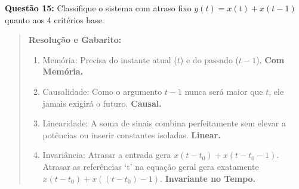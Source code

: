 \textbf{Questão 15:} Classifique o sistema com atraso fixo \(y(t) = x(t) + x(t-1)\) quanto aos 4 critérios base.

\begin{quote}
\textbf{Resolução e Gabarito:}

\begin{enumerate}
\def\labelenumi{\arabic{enumi}.}
\tightlist
\item
  Memória: Precisa do instante atual (\(t\)) e do passado (\(t-1\)). \textbf{Com Memória.}
\item
  Causalidade: Como o argumento \(t-1\) nunca será maior que \(t\), ele jamais exigirá o futuro. \textbf{Causal.}
\item
  Linearidade: A soma de sinais combina perfeitamente sem elevar a potências ou inserir constantes isoladas. \textbf{Linear.}
\item
  Invariância: Atrasar a entrada gera \(x(t-t_0) + x(t-t_0-1)\). Atrasar as referências `t' na equação geral gera exatamente \(x(t-t_0) + x((t-t_0)-1)\). \textbf{Invariante no Tempo.}
\end{enumerate}
\end{quote}
